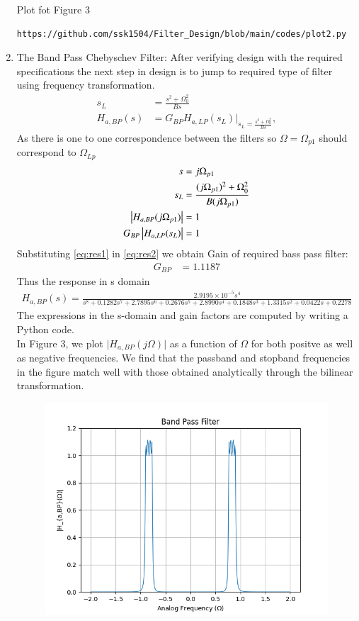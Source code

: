 \documentclass{article}
\begin{document}
\begin{enumerate}
Plot fot Figure 3
\begin{lstlisting}
https://github.com/ssk1504/Filter_Design/blob/main/codes/plot2.py
\end{lstlisting}
\item {The Band Pass Chebyschev Filter:} 
After verifying design with the required specifications the next step in design is to jump to required type of filter using frequency transformation. 
\begin{align}
    s_L &= \frac{s^2 + \Omega_0^2}{Bs} \\
    H_{a,BP}(s) &= G_{BP}H_{a,LP}(s_L)\vert_{s_L = \frac{s^2 + \Omega_0^2}{Bs}},
\end{align}
As there is one to one correspondence between the filters so $\Omega=\Omega_{p1}$ should correspond to $\Omega_{Lp}$
\begin{align}
    s &= j\Omega_{p1}\\
    s_{L} &= \frac{(j\Omega_{p1})^2 + \Omega_0^2}{B(j\Omega_{p1})} \label{eq:res1} \\ 
    \left\vert H_{a,BP}(j\Omega_{p1})\right\vert &= 1 \\
    G_{BP}\left\vert H_{a,LP}(s_L)\right\vert &= 1 \label{eq:res2}
\end{align}
Substituting \eqref{eq:res1} in \eqref{eq:res2} we obtain Gain of required bass pass filter:
\begin{align}
    G_{BP} &= 1.1187
\end{align}
Thus the response in s domain 
\begin{align}
   H_{a,BP}(s) = \frac{2.9195\times 10^{-5}s^4}{s^8 + 0.1282s^7 + 2.7895s^6 + 0.2676s^5 + 2.8990s^4 + 0.1848s^3 + 1.3315s^2 + 0.0422s + 0.2278}\label{eq:magnitude_bandpass_sdom}
\end{align}
The expressions in the s-domain and gain factors are computed by writing a Python code. \\
In Figure 3, we plot $\vert H_{a,BP}(j\Omega)\vert$ as a function of $\Omega$ for both positve as
well as negative frequencies.  We find that the passband and stopband frequencies in the figure
match well with those obtained analytically through the bilinear transformation.
\begin{figure}[H]
\centering
\includegraphics[width=1\columnwidth]{figs/Band_Pass_Filter.png}

\end{figure}
\end{enumerate}
\end{document}
